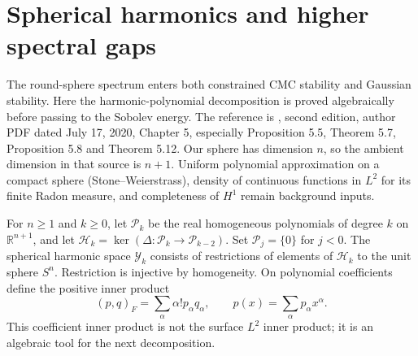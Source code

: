\chapter{Spherical harmonics and higher spectral gaps}\label{sec:spherical-harmonics-local}
The round-sphere spectrum enters both constrained CMC stability and Gaussian stability. Here the harmonic-polynomial decomposition is proved algebraically before passing to the Sobolev energy. The reference is \cite{ABR01}, second edition, author PDF dated July 17, 2020, Chapter 5, especially Proposition 5.5, Theorem 5.7, Proposition 5.8 and Theorem 5.12. Our sphere has dimension $n$, so the ambient dimension in that source is $n+1$. Uniform polynomial approximation on a compact sphere (Stone--Weierstrass), density of continuous functions in $L^2$ for its finite Radon measure, and completeness of $H^1$ remain background inputs.

\begin{definition}\label{def:homogeneous-harmonic-spaces}
For $n\geq1$ and $k\geq0$, let $\mathcal P_k$ be the real homogeneous polynomials of degree $k$ on $\mathbb R^{n+1}$, and let $\mathcal H_k=\ker(\Delta:\mathcal P_k\to\mathcal P_{k-2})$. Set $\mathcal P_j=\{0\}$ for $j<0$. The spherical harmonic space $\mathcal Y_k$ consists of restrictions of elements of $\mathcal H_k$ to the unit sphere $S^n$. Restriction is injective by homogeneity. On polynomial coefficients define the positive inner product
\[
 (p,q)_F=\sum_\alpha \alpha!p_\alpha q_\alpha,
 \qquad p(x)=\sum_\alpha p_\alpha x^\alpha.
\]
This coefficient inner product is not the surface $L^2$ inner product; it is an algebraic tool for the next decomposition.
\end{definition}

